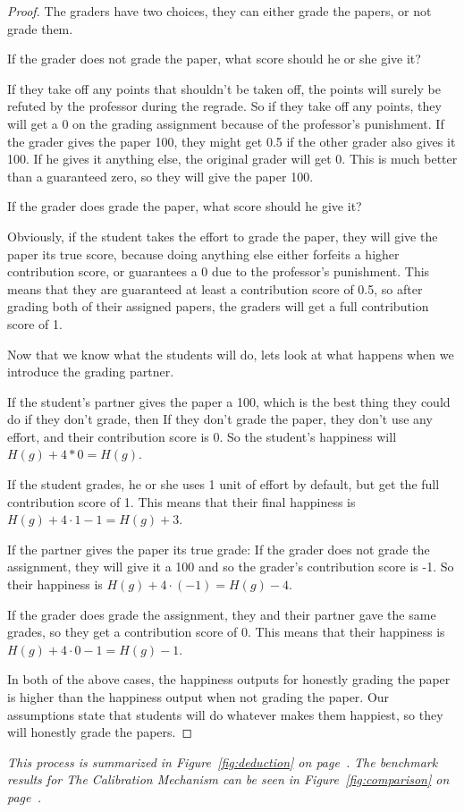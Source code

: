 \documentclass[12pt, Arial]{article}
\begin{document}
\begin{proof}
The graders have two choices, they can either grade the papers, or not grade them.

If the grader does not grade the paper, what score should he or she give it?

If they take off any points that shouldn't be taken off, the points will surely be refuted by the professor during the regrade.
So if they take off any points, they will get a 0 on the grading assignment because of the professor's punishment.
If the grader gives the paper 100, they might get 0.5 if the other grader also gives it 100. If he gives it anything else, the original grader will get 0. This is much better than a guaranteed zero, so they will give the paper 100.

If the grader does grade the paper, what score should he give it?

Obviously, if the student takes the effort to grade the paper, they will give the paper its true score, because doing anything else either forfeits a higher contribution score, or guarantees a 0 due to the professor's punishment. This means that they are guaranteed at least a contribution score of 0.5, so after grading both of their assigned papers, the graders will get a full contribution score of 1.

Now that we know what the students will do, lets look at what happens when we introduce the grading partner. 

If the student's partner gives the paper a 100, which is the best thing they could do if they don't grade, then
	If they don't grade the paper, they don't use any effort, and their contribution score is 0. So the student's happiness will $H(g) + 4*0 = H(g)$.

If the student grades, he or she uses 1 unit of effort by default, but get the full contribution score of 1. This means that their final happiness is $H(g) + 4\cdot1 - 1 = H(g)+3$.
	
If the partner gives the paper its true grade:
	If the grader does not grade the assignment, they will give it a 100 and so the grader's contribution score is -1. So their happiness is $H(g) + 4\cdot(-1) = H(g)-4$.

If the grader does grade the assignment, they and their partner gave the same grades, so they get a contribution score of 0. This means that their happiness is $H(g) + 4\cdot0 - 1 = H(g)-1$.
	
In both of the above cases, the happiness outputs for honestly grading the paper is higher than the happiness output when not grading the paper. Our assumptions state that students will do whatever makes them happiest, so they will honestly grade the papers.

\end{proof}
\noindent
\emph{This process is summarized in Figure~\ref{fig:deduction} on page~\pageref{fig:deduction}.}
\newline
\emph{The benchmark results for The Calibration Mechanism can be seen in Figure~\ref{fig:comparison} on page~\pageref{fig:comparison}.}
\end{document}
